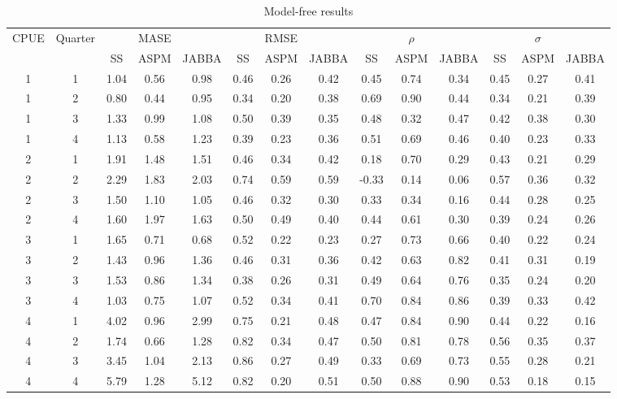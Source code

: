 \begin{table}[ht]
\caption{Model-free results}
\centering
\label{tab:mase}
\tiny
\begin{tabular}{|cc|ccc|ccc|ccc|ccc|}
  \hline
 CPUE & Quarter &  & MASE &  &  & RMSE & &  & $\rho$ &  & & $\sigma$ &  \\
      &         & SS & ASPM & JABBA & SS & ASPM & JABBA & SS & ASPM & JABBA & SS & ASPM & JABBA \\
\hline\hline
  1 & 1 & 1.04 & 0.56 & 0.98 & 0.46 & 0.26 & 0.42 & 0.45 & 0.74 & 0.34 & 0.45 & 0.27 & 0.41 \\ 
  1 & 2 & 0.80 & 0.44 & 0.95 & 0.34 & 0.20 & 0.38 & 0.69 & 0.90 & 0.44 & 0.34 & 0.21 & 0.39 \\ 
  1 & 3 & 1.33 & 0.99 & 1.08 & 0.50 & 0.39 & 0.35 & 0.48 & 0.32 & 0.47 & 0.42 & 0.38 & 0.30 \\ 
  1 & 4 & 1.13 & 0.58 & 1.23 & 0.39 & 0.23 & 0.36 & 0.51 & 0.69 & 0.46 & 0.40 & 0.23 & 0.33 \\ 
  2 & 1 & 1.91 & 1.48 & 1.51 & 0.46 & 0.34 & 0.42 & 0.18 & 0.70 & 0.29 & 0.43 & 0.21 & 0.29 \\ 
  2 & 2 & 2.29 & 1.83 & 2.03 & 0.74 & 0.59 & 0.59 & -0.33 & 0.14 & 0.06 & 0.57 & 0.36 & 0.32 \\ 
  2 & 3 & 1.50 & 1.10 & 1.05 & 0.46 & 0.32 & 0.30 & 0.33 & 0.34 & 0.16 & 0.44 & 0.28 & 0.25 \\ 
  2 & 4 & 1.60 & 1.97 & 1.63 & 0.50 & 0.49 & 0.40 & 0.44 & 0.61 & 0.30 & 0.39 & 0.24 & 0.26 \\ 
  3 & 1 & 1.65 & 0.71 & 0.68 & 0.52 & 0.22 & 0.23 & 0.27 & 0.73 & 0.66 & 0.40 & 0.22 & 0.24 \\ 
  3 & 2 & 1.43 & 0.96 & 1.36 & 0.46 & 0.31 & 0.36 & 0.42 & 0.63 & 0.82 & 0.41 & 0.31 & 0.19 \\ 
  3 & 3 & 1.53 & 0.86 & 1.34 & 0.38 & 0.26 & 0.31 & 0.49 & 0.64 & 0.76 & 0.35 & 0.24 & 0.20 \\ 
  3 & 4 & 1.03 & 0.75 & 1.07 & 0.52 & 0.34 & 0.41 & 0.70 & 0.84 & 0.86 & 0.39 & 0.33 & 0.42 \\ 
  4 & 1 & 4.02 & 0.96 & 2.99 & 0.75 & 0.21 & 0.48 & 0.47 & 0.84 & 0.90 & 0.44 & 0.22 & 0.16 \\ 
  4 & 2 & 1.74 & 0.66 & 1.28 & 0.82 & 0.34 & 0.47 & 0.50 & 0.81 & 0.78 & 0.56 & 0.35 & 0.37 \\ 
  4 & 3 & 3.45 & 1.04 & 2.13 & 0.86 & 0.27 & 0.49 & 0.33 & 0.69 & 0.73 & 0.55 & 0.28 & 0.21 \\ 
  4 & 4 & 5.79 & 1.28 & 5.12 & 0.82 & 0.20 & 0.51 & 0.50 & 0.88 & 0.90 & 0.53 & 0.18 & 0.15 \\ 
 \hline
\end{tabular}
\end{table}
